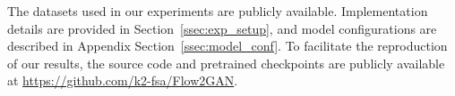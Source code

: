 The datasets used in our experiments are publicly available. Implementation details are provided in Section~\ref{ssec:exp_setup}, and model configurations are described in Appendix Section~\ref{ssec:model_conf}. 
To facilitate the reproduction of our results, the source code and pretrained checkpoints are publicly available at \url{https://github.com/k2-fsa/Flow2GAN}.
